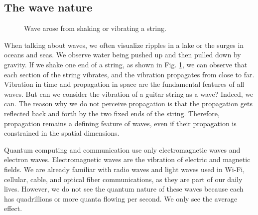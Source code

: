 \documentclass[oneside, letter, 12pt]{book}
\begin{document}
\subsection{The wave nature}
\begin{figure}[h]\label{String}
\caption{Wave arose from shaking or vibrating a string.}
\end{figure}

When talking about waves, we often visualize ripples in a lake or the surges in oceans and seas. We observe water being pushed up and then pulled down by gravity. If we shake one end of a string, as shown in Fig. \ref{String}, we can observe that each section of the string vibrates, and the vibration propagates from close to far. Vibration in time and propagation in space are the fundamental features of all waves. But can we consider the vibration of a guitar string as a wave? Indeed, we can. The reason why we do not perceive propagation is that the propagation gets reflected back and forth by the two fixed ends of the string. Therefore, propagation remains a defining feature of waves, even if their propagation is constrained in the spatial dimensions.

Quantum computing and communication use only electromagnetic waves and electron waves. Electromagnetic waves are the vibration of electric and magnetic fields. We are already familiar with radio waves and light waves used in Wi-Fi, cellular, cable, and optical fiber communications, as they are part of our daily lives. However, we do not see the quantum nature of these waves because each has quadrillions or more quanta flowing per second. We only see the average effect.
\end{document}
